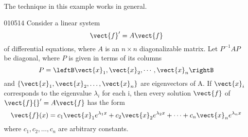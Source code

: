 The technique in this example works in general.


\begin{theorem}{}{010514}
Consider a linear system
\begin{equation*}
\vect{f}^{\prime} = A \vect{f}
\end{equation*}
of differential equations, where $A$ is an $n \times n$ diagonalizable matrix. Let $P^{-1}AP$ be diagonal, where $P$ is given in terms of its columns
\begin{equation*}
P = \leftB \vect{x}_1,\vect{x}_2, \cdots, \vect{x}_n \rightB
\end{equation*}
and $\{\vect{x}_{1}, \vect{x}_{2}, \dots , \vect{x}_{n}\}$ are eigenvectors of A. If $\vect{x}_{i}$ corresponds to the eigenvalue $\lambda_{i}$ for each i, then every solution $\vect{f}$ of $\vect{f}{}^{\prime} = A\vect{f}$ has the form
\begin{equation*}
\vect{f}(x) = c_1\vect{x}_1 e^{\lambda_1x} +c_2\vect{x}_2 e^{\lambda_2x} + \cdots + c_n\vect{x}_n e^{\lambda_nx}
\end{equation*}
where $c_{1}, c_{2}, \dots , c_{n}$ are arbitrary constants.
\end{theorem}

